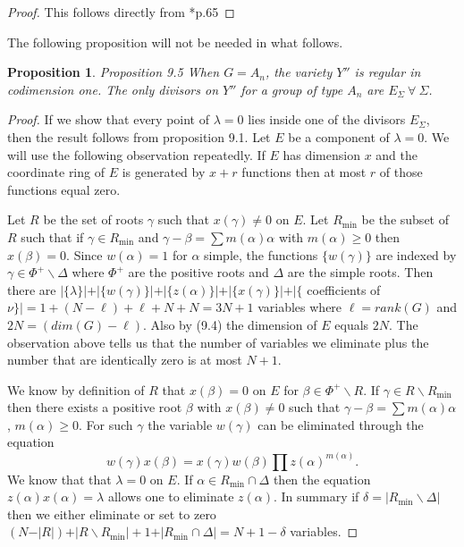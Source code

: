 \documentclass{memo-l}
\newtheorem{proposition}[theorem]{Proposition}
\theoremstyle{definition}
\theoremstyle{remark}
\numberwithin{section}{chapter}
\numberwithin{equation}{chapter}
\begin{document}
\begin{proof}    This follows directly from \cite{MR971985}*{p.65}
\end{proof}

{\medskip}

   The following proposition will not be needed in what follows.

\begin{proposition}{Proposition 9.5}   When $G = A_{n}$, the variety $Y''$ is regular in
codimension one.
 The only divisors on $Y''$ for a group of type $A_{n}$ are $E_{{\Sigma}}
{\ \forall\ } {\Sigma}$.
\end{proposition}


\begin{proof}   If we show that every point of ${\lambda} = 0$ lies inside
one of the divisors $E_{{\Sigma}}$, then the result follows from proposition 9.1.
 Let $E$ be a component of ${\lambda} = 0$.
 We will use the following observation repeatedly.
 If $E$ has dimension $x$ and the coordinate ring of $E$ is generated by $x+r$
functions then at most $r$ of those functions equal zero.

Let $R$ be the set of roots ${\gamma}$ such that $x({\gamma})\ne 0$ on $E$.
 Let $R_{\min}$ be the subset of $R$ such that if ${\gamma} \in R_{\min}$ and
${\gamma}-{\beta}=\sum m({\alpha}){\alpha}$ with $m({\alpha}) \ge 0$ then
$x({\beta}) = 0$.
 Since $w({\alpha}) = 1$ for ${\alpha}$ simple, the functions $\{w(\gamma)\}$
are indexed by ${\gamma} \in {\Phi}^{+}\backslash {\Delta}$ where
${\Phi}^{+}$ are the positive roots and ${\Delta}$ are the simple roots.
 Then there are $\vert \{\lambda\}\vert  + \vert \{w(\gamma)\}\vert  +
\vert \{z(\alpha)\}\vert + \vert \{x(\gamma)\}\vert  + \vert
\{$ coefficients of ${\nu}\}\vert  = 1 + (N-{\ell}) + {\ell} + N + N = 3N + 1$
variables where ${\ell} = rank(G)$ and $2N = (dim(G)-{\ell})$.
 Also by (9.4) the dimension of $E$ equals $2N$.
 The observation above tells us that the number of variables we eliminate
plus the number that are identically zero is at most $N+1$.

   We know by definition of $R$ that $x({\beta}) = 0$ on $E$ for ${\beta} \in
{\Phi}^{+}\backslash R$.
 If ${\gamma} \in R\backslash R_{\min}$ then there exists a positive root
${\beta}$ with $x({\beta})\ne 0$ such that ${\gamma}-{\beta} =
\sum m({\alpha}){\alpha}$, $m({\alpha}) \ge 0$.
 For such ${\gamma}$ the variable $w({\gamma})$ can be eliminated through the
equation $$w({\gamma})x({\beta}) = x({\gamma})w({\beta}) \prod
z({\alpha})^{m({\alpha})}.$$
 We know that that ${\lambda} = 0$ on $E$.
 If ${\alpha} \in R_{\min} {\cap} {\Delta}$ then the equation
$z({\alpha})x({\alpha}) = {\lambda}$ allows one to eliminate $z({\alpha})$.
In summary if ${\delta} = \vert R_{\min}\backslash {\Delta}\vert$  then we
either eliminate or set to zero $(N-\vert R\vert ) + \vert R\backslash
R_{\min}\vert  + 1 + \vert R_{\min} {\cap} {\Delta}\vert  =
N + 1 - {\delta}$ variables.


\end{proof}
\end{document}
